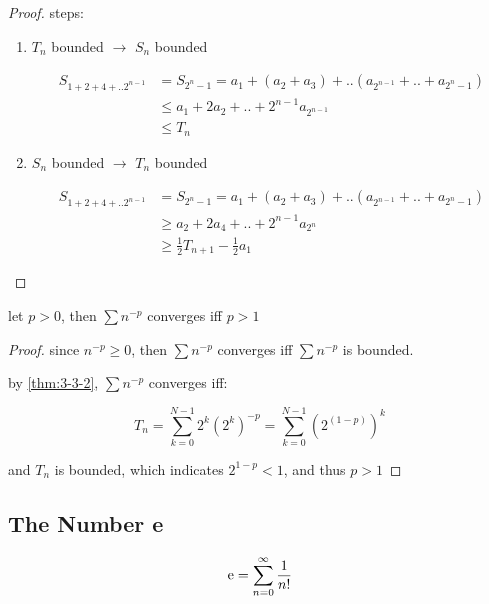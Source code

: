 \begin{proof}
    steps:

    \begin{enumerate}
        \item $T_n$ bounded $\to$ $S_n$ bounded

        \begin{align*}
            S_{1 + 2 + 4 + .. 2^{n-1}} & = S_{2^{n} - 1} = a_1 + (a_2 + a_3) + .. (a_{2^{n-1}} + .. + a_{2^{n} - 1}) \\
                & \le a_1 + 2a_2 + .. + 2^{n-1}a_{2^{n-1}} \\
                & \le T_{n}
        \end{align*}

        \item $S_n$ bounded $\to$ $T_n$ bounded

        \begin{align*}
            S_{1 + 2 + 4 + .. 2^{n-1}} & = S_{2^{n} - 1} = a_1 + (a_2 + a_3) + .. (a_{2^{n-1}} + .. + a_{2^{n} - 1}) \\ 
            & \ge a_2 + 2a_4 + .. + 2^{n-1}a_{2^n} \\
            & \ge \frac{1}{2}T_{n+1} - \frac{1}{2}a_1
        \end{align*}
    \end{enumerate}
\end{proof}

\begin{thm}
    let $p>0$, then $\sum n^{-p}$ converges iff $p > 1$
\end{thm}

\begin{proof}
    since $n^{-p} \ge 0$, then $\sum n^{-p}$ converges iff $\sum n^{-p}$ is bounded.

    by \autoref{thm:3-3-2}, $\sum n^{-p}$ converges iff:

    \[
        T_n = \sum_{k=0}^{N-1}2^k (2^k)^{-p} = \sum_{k=0}^{N-1}(2^{(1-p)})^k
    \]

    and $T_n$ is bounded, which indicates $2^{1-p} < 1$, and thus $p > 1$
\end{proof}

\subsection{The Number e}

\begin{definition}[exponention]
    \[
        \mathrm{e} = \sum_{n=0}^{\infty}\frac{1}{n!}
    \]
\end{definition}

